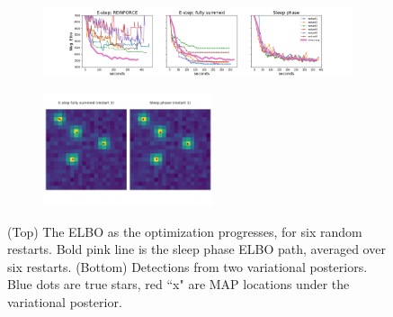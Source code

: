 \begin{figure}[!ht]
    \centering
    \begin{subfigure}[t]{\textwidth}
    \centering
    \includegraphics[width=\textwidth]{figures/optim_path_compare.png}
    \end{subfigure}
    
    \begin{subfigure}[t]{\textwidth}
    \centering
    \includegraphics[width=0.55\textwidth]{figures/optim_path_detect_compare.png}
    \end{subfigure}
    \vspace{-3em}
    \caption{(Top) The ELBO as the optimization progresses, for six random restarts. Bold pink line is the sleep phase ELBO path, averaged over six restarts. (Bottom) Detections from two variational posteriors. Blue dots are true stars, red ``x" are MAP locations under the variational posterior. }
    \label{fig:optim_path}
\end{figure}

